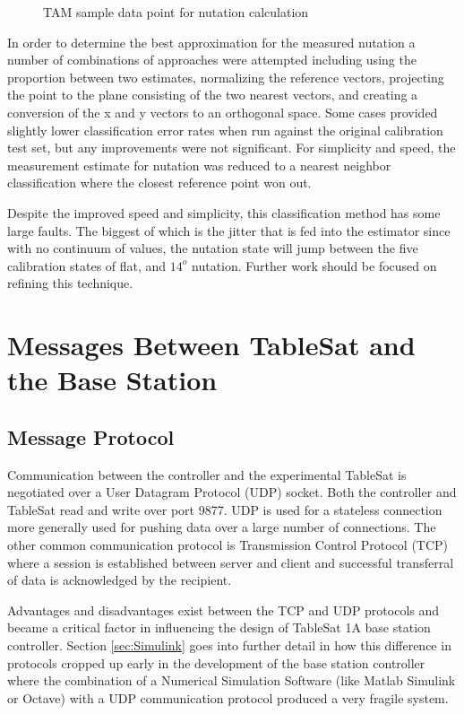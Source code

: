 \begin{figure}[H]
  \centerline{}
  \caption{TAM sample data point for nutation calculation}
  \label{fig:TAMPoint191}
\end{figure}

In order to determine the best approximation for the measured nutation a number of combinations of approaches were attempted including using the proportion between two estimates, normalizing the reference vectors, projecting the point to the plane consisting of the two nearest vectors, and creating a conversion of the x and y vectors to an orthogonal space.  Some cases provided slightly lower classification error rates when run against the original calibration test set, but any improvements were not significant.  For simplicity and speed, the measurement estimate for nutation was reduced to a nearest neighbor classification \cite{nearestneighbor} where the closest reference point won out.

Despite the improved speed and simplicity, this classification method has some large faults.  The biggest of which is the jitter that is fed into the estimator since with no continuum of values, the nutation state will jump between the five calibration states of flat, and $14^o$ nutation.  Further work should be focused on refining this technique.

\section{Messages Between TableSat and the Base Station}


\subsection{Message Protocol}
\label{subsec:UDPTCP}

Communication between the controller and the experimental TableSat is negotiated over a User Datagram Protocol (UDP) socket.  Both the controller and TableSat read and write over port 9877.  UDP is used for a stateless connection more generally used for pushing data over a large number of connections.  The other common communication protocol is Transmission Control Protocol (TCP) where a session is established between server and client and successful transferral of data is acknowledged by the recipient.

Advantages and disadvantages exist between the TCP and UDP protocols and became a critical factor in influencing the design of TableSat 1A base station controller. Section \ref{sec:Simulink} goes into further detail in how this difference in protocols cropped up early in the development of the base station controller where the combination of a Numerical Simulation Software (like Matlab Simulink or Octave) with a UDP communication protocol produced a very fragile system.

